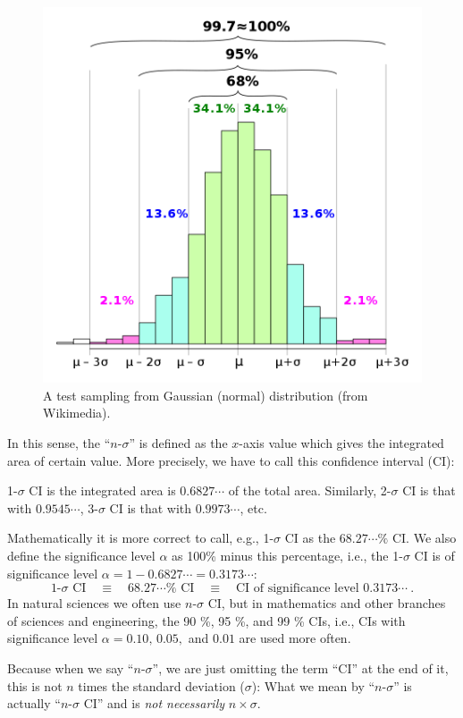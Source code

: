 \begin{figure}[ht!]
  \centering
  \includegraphics[width=0.5\linewidth]{figs/nsigma_wiki}
  \caption{A test sampling from Gaussian (normal) distribution (from Wikimedia).}
  \label{fig:nsigmawiki}
\end{figure}

In this sense, the ``$ n $-$ \sigma $'' is defined as the $ x $-axis value which gives the integrated area of certain value. More precisely, we have to call this confidence interval (CI):

\begin{defn}
  1-$ \sigma $ CI is the integrated area is $ 0.6827\cdots $ of the total area. Similarly, 2-$ \sigma $ CI is that with $ 0.9545\cdots $, 3-$ \sigma $ CI is that with $ 0.9973\cdots $, etc. 
\end{defn}

Mathematically it is more correct to call, e.g., 1-$ \sigma $ CI as the $ 68.27\cdots \% $ CI. We also define the significance level $ \alpha $ as 100\% minus this percentage, i.e., the 1-$ \sigma $ CI is of significance level $ \alpha = 1 - 0.6827\cdots = 0.3173\cdots $:
\begin{equation}
  \text{1-}\sigma \text{ CI}
  \quad \equiv \quad 
  68.27\cdots \% \text{ CI}
  \quad \equiv \quad 
  \text{CI of significance level } 0.3173 \cdots ~.
\end{equation}
In natural sciences we often use $ n $-$ \sigma $ CI, but in mathematics and other branches of sciences and engineering, the 90 \%, 95 \%, and 99 \% CIs, i.e., CIs with significance level $ \alpha = 0.10,\, 0.05,$ and $ 0.01 $ are used more often.

Because when we say ``$ n $-$ \sigma $'', we are just omitting the term ``CI'' at the end of it, this is not $ n $ times the standard deviation ($ \sigma $): What we mean by ``$ n $-$ \sigma $'' is actually ``$ n $-$ \sigma $ CI'' and is \textit{not necessarily} $ n \times \sigma $. 

